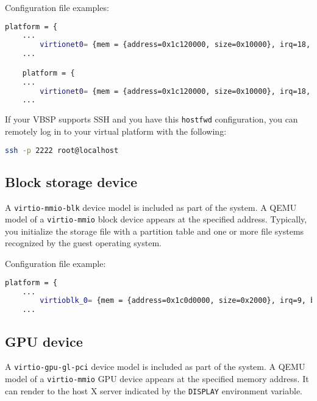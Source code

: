 Configuration file examples:

\small
\begin{lstlisting}[language=bash]
    platform = {
    ...
        virtionet0= {mem = {address=0x1c120000, size=0x10000}, irq=18, netdev_str="type=user,hostfwd=tcp::2222-:22,hostfwd=tcp::2221-:21"};
    ...

    platform = {
    ...
        virtionet0= {mem = {address=0x1c120000, size=0x10000}, irq=18, netdev_str="type=tap"};
    ...
\end{lstlisting}
\normalsize


If your VBSP supports SSH and you have this {\small{\lstinline!hostfwd!}} configuration, you can remotely log in to your virtual platform with the following:

\small
\begin{lstlisting}[language=bash]
    ssh -p 2222 root@localhost
\end{lstlisting}
\normalsize


\subsection{Block storage device}

A {\small{\lstinline!virtio-mmio-blk!}} device model is included as part of the system. A QEMU model of a {\small{\lstinline!virtio-mmio!}} block device appears at the specified address. Typically, you initialize the storage file with a partition table and one or more file systems recognized by the guest operating system.

Configuration file example:

\small
\begin{lstlisting}[language=bash]
    platform = {
    ...
        virtioblk_0= {mem = {address=0x1c0d0000, size=0x2000}, irq=9, blkdev_str="file="..top().."system_qdrive.img,format=raw,if=none"};
    ...
\end{lstlisting}
\normalsize


\subsection{GPU device}
\label{sec:gpuDevice}

A {\small{\lstinline!virtio-gpu-gl-pci!}} device model is included as part
of the system. A QEMU model of a {\small{\lstinline!virtio-mmio!}} GPU
device appears at the specified memory address. It can render to the host
X server indicated by the {\small{\lstinline!DISPLAY!}} environment variable.

